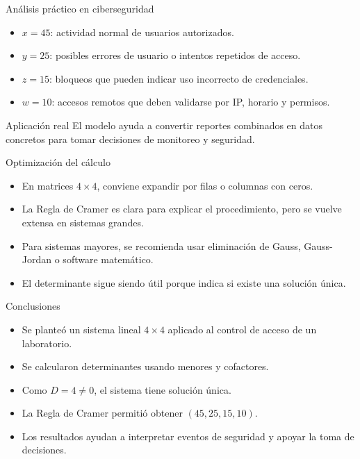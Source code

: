 \documentclass[aspectratio=169]{beamer}
\begin{document}
\begin{frame}{Análisis práctico en ciberseguridad}
\begin{itemize}
    \item $x=45$: actividad normal de usuarios autorizados.
    \item $y=25$: posibles errores de usuario o intentos repetidos de acceso.
    \item $z=15$: bloqueos que pueden indicar uso incorrecto de credenciales.
    \item $w=10$: accesos remotos que deben validarse por IP, horario y permisos.
\end{itemize}

\begin{block}{Aplicación real}
El modelo ayuda a convertir reportes combinados en datos concretos para tomar decisiones de monitoreo y seguridad.
\end{block}
\end{frame}

\begin{frame}{Optimización del cálculo}
\begin{itemize}
    \item En matrices $4\times4$, conviene expandir por filas o columnas con ceros.
    \item La Regla de Cramer es clara para explicar el procedimiento, pero se vuelve extensa en sistemas grandes.
    \item Para sistemas mayores, se recomienda usar eliminación de Gauss, Gauss-Jordan o software matemático.
    \item El determinante sigue siendo útil porque indica si existe una solución única.
\end{itemize}
\end{frame}

\begin{frame}{Conclusiones}
\begin{itemize}
    \item Se planteó un sistema lineal $4\times4$ aplicado al control de acceso de un laboratorio.
    \item Se calcularon determinantes usando menores y cofactores.
    \item Como $D=4\neq0$, el sistema tiene solución única.
    \item La Regla de Cramer permitió obtener $(45,25,15,10)$.
    \item Los resultados ayudan a interpretar eventos de seguridad y apoyar la toma de decisiones.
\end{itemize}
\end{frame}
\end{document}
